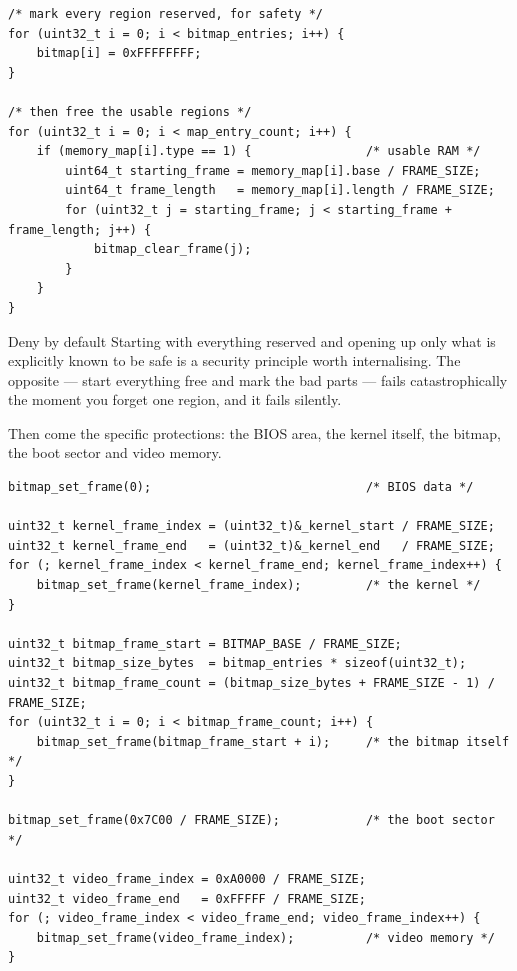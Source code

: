 \begin{lstlisting}[style=c]
/* mark every region reserved, for safety */
for (uint32_t i = 0; i < bitmap_entries; i++) {
    bitmap[i] = 0xFFFFFFFF;
}

/* then free the usable regions */
for (uint32_t i = 0; i < map_entry_count; i++) {
    if (memory_map[i].type == 1) {                /* usable RAM */
        uint64_t starting_frame = memory_map[i].base / FRAME_SIZE;
        uint64_t frame_length   = memory_map[i].length / FRAME_SIZE;
        for (uint32_t j = starting_frame; j < starting_frame + frame_length; j++) {
            bitmap_clear_frame(j);
        }
    }
}
\end{lstlisting}

\begin{concept}{Deny by default}
Starting with everything reserved and opening up only what is explicitly known to be safe is a
security principle worth internalising. The opposite --- start everything free and mark the bad
parts --- fails catastrophically the moment you forget one region, and it fails silently.
\end{concept}

Then come the specific protections: the BIOS area, the kernel itself, the bitmap, the boot sector
and video memory.

\begin{lstlisting}[style=c]
bitmap_set_frame(0);                              /* BIOS data */

uint32_t kernel_frame_index = (uint32_t)&_kernel_start / FRAME_SIZE;
uint32_t kernel_frame_end   = (uint32_t)&_kernel_end   / FRAME_SIZE;
for (; kernel_frame_index < kernel_frame_end; kernel_frame_index++) {
    bitmap_set_frame(kernel_frame_index);         /* the kernel */
}

uint32_t bitmap_frame_start = BITMAP_BASE / FRAME_SIZE;
uint32_t bitmap_size_bytes  = bitmap_entries * sizeof(uint32_t);
uint32_t bitmap_frame_count = (bitmap_size_bytes + FRAME_SIZE - 1) / FRAME_SIZE;
for (uint32_t i = 0; i < bitmap_frame_count; i++) {
    bitmap_set_frame(bitmap_frame_start + i);     /* the bitmap itself */
}

bitmap_set_frame(0x7C00 / FRAME_SIZE);            /* the boot sector */

uint32_t video_frame_index = 0xA0000 / FRAME_SIZE;
uint32_t video_frame_end   = 0xFFFFF / FRAME_SIZE;
for (; video_frame_index < video_frame_end; video_frame_index++) {
    bitmap_set_frame(video_frame_index);          /* video memory */
}
\end{lstlisting}

